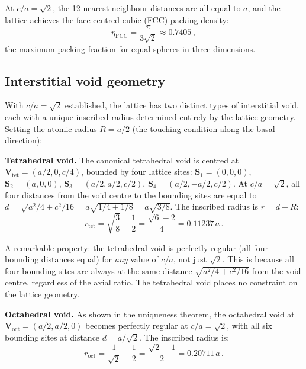 \documentclass[review,number,sort&compress]{elsarticle}
\newcommand{\roct}{r_{\mathrm{oct}}}
\newcommand{\rtet}{r_{\mathrm{tet}}}
\begin{document}
At $c/a = \sqrt{2}$, the 12 nearest-neighbour distances are all equal to
$a$, and the lattice achieves the face-centred cubic (FCC) packing
density:
\begin{equation}
  \eta_{\mathrm{FCC}} = \frac{\pi}{3\sqrt{2}} \approx 0.7405\,,
  \label{eq:packing}
\end{equation}
the maximum packing fraction for equal spheres in three dimensions.

\subsection{Interstitial void geometry}
\label{sec:voids}

With $c/a = \sqrt{2}$ established, the lattice has two distinct types
of interstitial void, each with a unique inscribed radius determined
entirely by the lattice geometry. Setting the atomic radius
$R = a/2$ (the touching condition along the basal direction):

\medskip
\noindent\textbf{Tetrahedral void.}
The canonical tetrahedral void is centred at $\bm{V}_{\mathrm{tet}}
= (a/2, 0, c/4)$, bounded by four lattice sites:
$\bm{S}_1 = (0,0,0)$, $\bm{S}_2 = (a,0,0)$,
$\bm{S}_3 = (a/2, a/2, c/2)$, $\bm{S}_4 = (a/2, -a/2, c/2)$.
At $c/a = \sqrt{2}$, all four distances from the void centre to the
bounding sites are equal to $d = \sqrt{a^2/4 + c^2/16}
= a\sqrt{1/4 + 1/8} = a\sqrt{3/8}$.
The inscribed radius is $r = d - R$:
\begin{equation}
  \boxed{\rtet = \sqrt{\frac{3}{8}} - \frac{1}{2}
  = \frac{\sqrt{6}-2}{4} = 0.11237\,a}\,.
  \label{eq:rtet}
\end{equation}

A remarkable property: the tetrahedral void is perfectly regular
(all four bounding distances equal) for \textit{any} value of $c/a$,
not just $\sqrt{2}$. This is because all four bounding sites are always
at the same distance $\sqrt{a^2/4 + c^2/16}$ from the void centre,
regardless of the axial ratio. The tetrahedral void places no constraint
on the lattice geometry.

\medskip
\noindent\textbf{Octahedral void.}
As shown in the uniqueness theorem, the octahedral void at
$\bm{V}_{\mathrm{oct}} = (a/2, a/2, 0)$ becomes perfectly regular at
$c/a = \sqrt{2}$, with all six bounding sites at distance
$d = a/\sqrt{2}$. The inscribed radius is:
\begin{equation}
  \boxed{\roct = \frac{1}{\sqrt{2}} - \frac{1}{2}
  = \frac{\sqrt{2}-1}{2} = 0.20711\,a}\,.
  \label{eq:roct}
\end{equation}
\end{document}
